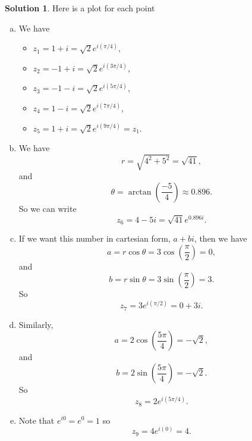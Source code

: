 \documentclass[12pt]{report} %
\newcommand{\RE}{\mathrm{Re}}
\newcommand{\IM}{\mathrm{Im}}
\theoremstyle{definition}
\newtheorem{solution}{Solution}
\begin{document}
\begin{solution}
Here is a plot for each point
        \begin{center}
        \end{center}
        \begin{enumerate}[(a)]
            \item We have
            \begin{itemize}
                \item $z_1 = 1+i = \sqrt{2}e^{i(\pi/4)}$,
                \item $z_2 = -1+i = \sqrt{2}e^{i(3\pi/4)}$,
                \item $z_3 = -1-i = \sqrt{2}e^{i(5\pi/4)}$,
                \item $z_4 = 1-i = \sqrt{2}e^{i(7\pi/4)}$,
                \item $z_5 = 1+i = \sqrt{2}e^{i(9\pi/4)}=z_1$.
            \end{itemize}
            
            \item We have 
            \[
            r= \sqrt{4^2+5^2}=\sqrt{41},
            \]
            and
            \[
            \theta = \arctan \left( \frac{-5}{4}\right)\approx 0.896.
            \]
            So we can write
            \[
            z_6 = 4-5i = \sqrt{41}e^{0.896i}.
            \]
            \item If we want this number in cartesian form, $a+bi$, then we have 
            \[
            a=r\cos \theta = 3 \cos\left( \frac{\pi}{2}\right) = 0,
            \]
            and
            \[
            b = r \sin \theta = 3 \sin \left( \frac{\pi}{2}\right) = 3.
            \]
            So
            \[
            z_7 = 3e^{i(\pi/2)} = 0+3i.
            \]
            \item Similarly,
            \[
            a = 2\cos \left( \frac{5\pi}{4}\right) = -\sqrt{2},
            \]
            and
            \[
            b = 2 \sin \left(\frac{5\pi}{4}\right) = -\sqrt{2}.
            \]
            So
            \[
            z_8 = 2e^{i(5\pi/4)}.
            \]
            \item Note that $e^{i0}=e^0=1$ so 
            \[
            z_9 = 4e^{i(0)}=4.
            \]
        \end{enumerate}
\end{solution}
\end{document}
